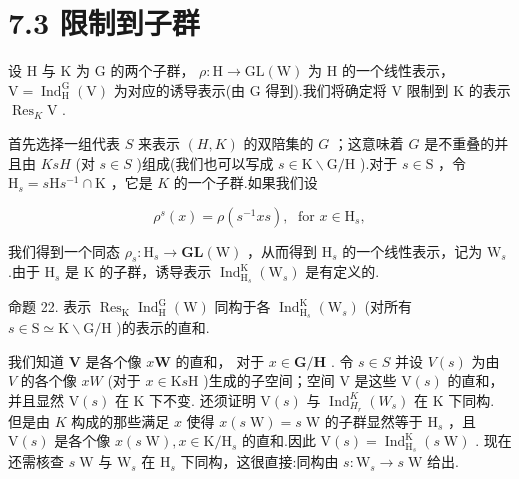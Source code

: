 \documentclass[10pt]{article}
\begin{document}
\section*{7.3 限制到子群}

设 \(\mathrm{H}\) 与 \(\mathrm{K}\) 为 \(\mathrm{G}\) 的两个子群， \(\rho  : \mathrm{H} \rightarrow  \mathrm{{GL}}\left( \mathrm{W}\right)\) 为 \(\mathrm{H}\) 的一个线性表示， \(\mathrm{V} = {\operatorname{Ind}}_{\mathrm{H}}^{\mathrm{G}}\left( \mathrm{V}\right)\) 为对应的诱导表示(由 \(\mathrm{G}\) 得到).我们将确定将 \(\mathrm{V}\) 限制到 \(\mathrm{K}\) 的表示 \({\operatorname{Res}}_{K}\mathrm{V}\) .

首先选择一组代表 \(S\) 来表示 \(\left( {H,K}\right)\) 的双陪集的 \(G\) ；这意味着 \(G\) 是不重叠的并且由 \({KsH}\) (对 \(s \in  S\) )组成(我们也可以写成 \(s \in  \mathrm{K} \smallsetminus  \mathrm{G}/\mathrm{H}\) ).对于 \(s \in  \mathrm{S}\) ，令 \({\mathrm{H}}_{s} = s\mathrm{H}{s}^{-1} \cap  \mathrm{K}\) ，它是 \(K\) 的一个子群.如果我们设

\[
{\rho }^{s}\left( x\right)  = \rho \left( {{s}^{-1}{xs}}\right) ,\;\text{ for }x \in  {\mathrm{H}}_{s},
\]

我们得到一个同态 \({\rho }_{s} : {\mathrm{H}}_{s} \rightarrow  \mathbf{{GL}}\left( \mathrm{W}\right)\) ，从而得到 \({\mathrm{H}}_{s}\) 的一个线性表示，记为 \({\mathrm{W}}_{s}\) .由于 \({\mathrm{H}}_{s}\) 是 \(\mathrm{K}\) 的子群，诱导表示 \({\operatorname{Ind}}_{{\mathrm{H}}_{s}}^{\mathrm{K}}\left( {\mathrm{W}}_{s}\right)\) 是有定义的.

命题 22. 表示 \({\operatorname{Res}}_{\mathrm{K}}{\operatorname{Ind}}_{\mathrm{H}}^{\mathrm{G}}\left( \mathrm{W}\right)\) 同构于各 \({\operatorname{Ind}}_{{\mathrm{H}}_{s}}^{\mathrm{K}}\left( {\mathrm{W}}_{s}\right)\) (对所有 \(s \in  \mathrm{S} \simeq  \mathrm{K} \smallsetminus  \mathrm{G}/\mathrm{H}\) )的表示的直和.

我们知道 \(\mathbf{V}\) 是各个像 \(x\mathbf{W}\) 的直和， 对于 \(x \in  \mathbf{G}/\mathbf{H}\) . 令 \(s \in  S\) 并设 \(V\left( s\right)\) 为由 \(V\) 的各个像 \({xW}\) (对于 \(x \in  \mathrm{K}s\mathrm{H}\) )生成的子空间；空间 \(\mathrm{V}\) 是这些 \(\mathrm{V}\left( s\right)\) 的直和，并且显然 \(\mathrm{V}\left( s\right)\) 在 \(\mathrm{K}\) 下不变. 还须证明 \(\mathrm{V}\left( s\right)\) 与 \({\operatorname{Ind}}_{{H}_{r}}^{K}\left( {W}_{s}\right)\) 在 \(\mathrm{K}\) 下同构. 但是由 \(K\) 构成的那些满足 \(x\) 使得 \(x\left( {s\mathrm{\;W}}\right)  = s\mathrm{\;W}\) 的子群显然等于 \({\mathrm{H}}_{s}\) ，且 \(\mathrm{V}\left( s\right)\) 是各个像 \(x\left( {s\mathrm{\;W}}\right) ,x \in  \mathrm{K}/{\mathrm{H}}_{s}\) 的直和.因此 \(\mathrm{V}\left( s\right)  = {\operatorname{Ind}}_{{\mathrm{H}}_{s}}^{\mathrm{K}}\left( {s\mathrm{\;W}}\right)\) . 现在还需核查 \(s\mathrm{\;W}\) 与 \({\mathrm{W}}_{s}\) 在 \({\mathrm{H}}_{s}\) 下同构，这很直接:同构由 \(s : {\mathrm{W}}_{s} \rightarrow  s\mathrm{\;W}\) 给出.
\end{document}

